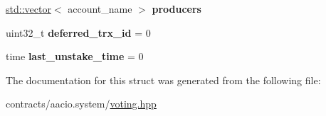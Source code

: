 \begin{DoxyCompactItemize}
\mbox{\hyperlink{classstd_1_1vector}{std\+::vector}}$<$ account\+\_\+name $>$ {\bfseries producers}
\item 
\mbox{\label{structaaciosystem_1_1voting_1_1voter__info_aa0591cde5518d0a2e1f4b616ba98e40b}} 
uint32\+\_\+t {\bfseries deferred\+\_\+trx\+\_\+id} = 0
\item 
\mbox{\label{structaaciosystem_1_1voting_1_1voter__info_a7b5385e9efd5b827e4225e8cdadccd4d}} 
time {\bfseries last\+\_\+unstake\+\_\+time} = 0
\end{DoxyCompactItemize}


The documentation for this struct was generated from the following file\+:\begin{DoxyCompactItemize}
\item 
contracts/aacio.\+system/\mbox{\hyperlink{voting_8hpp}{voting.\+hpp}}\end{DoxyCompactItemize}
